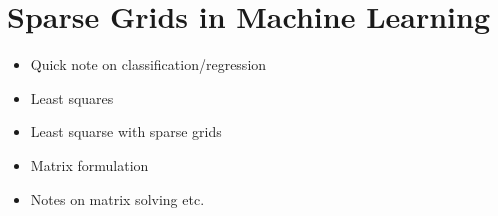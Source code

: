 \section{Sparse Grids in Machine Learning}
\begin{itemize}
\item Quick note on classification/regression
\item Least squares
\item Least squarse with sparse grids
\item Matrix formulation
\item Notes on matrix solving etc.
\end{itemize}

